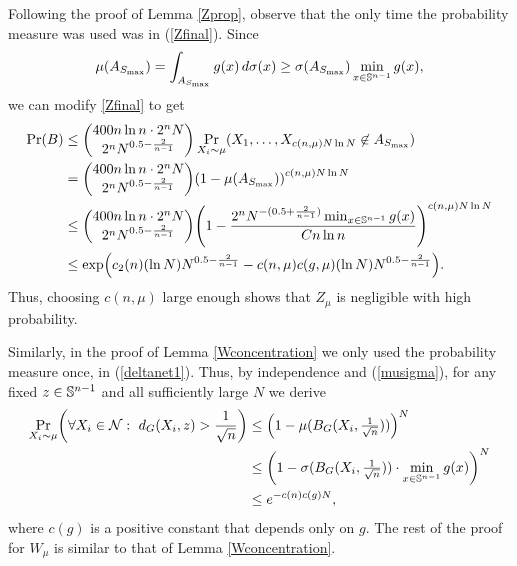 Following the proof of Lemma \ref{Zprop},  observe that the only time  the probability measure was used was in  (\ref{Zfinal}). Since
\begin{equation}\label{musigma}
\mu(A_{S_{\max}})=\int_{A_{S_{\max}}} g(x)\,d\sigma(x) \geq \sigma(A_{S_{\max}})\min_{x\in\mathbb{S}^{n-1}}g(x),
\end{equation}
we can modify \eqref{Zfinal} to get
\begin{align*}\Pr(B)&\leq\binom{400n\ln n\cdot2^{n}N}{2^{n}N^{0.5-\frac{2}{n-1}}}\Pr_{X_{i}\sim\mu}(X_{1},\ldots,X_{c(n,\mu)N\ln N}\not\in A_{S_{\max}})  \\&=\binom{400n\ln n\cdot2^{n}N}{2^{n}N^{0.5-\frac{2}{n-1}}}\left(1-\mu(A_{S_{\max}})\right)^{c(n,\mu)N\ln N}\\
& \leq\binom{400n\ln n\cdot2^{n}N}{2^{n}N^{0.5-\frac{2}{n-1}}}\left(1-\frac{2^{n}N^{-(0.5+\frac{2}{n-1})}\min_{x\in\Sp}g(x)}{Cn\ln n}\right)^{c(n,\mu)N\ln N}\\
& \leq\exp\left(c_2(n)(\ln N)N^{0.5-\frac{2}{n-1}}-c(n,\mu)c(g,\mu)(\ln N)N^{0.5-\frac{2}{n-1}}\right).
\end{align*}
Thus, choosing $c(n,\mu)$ large enough shows that $Z_\mu$ is negligible with high probability.

Similarly, in the proof of Lemma \ref{Wconcentration} we only used the probability measure once, in (\ref{deltanet1}). Thus, by independence and (\ref{musigma}), for any fixed $z\in\mathbb{S}^{n-1}$ and all sufficiently large $N$ we derive
\begin{align*}
\Pr_{X_i\sim\mu}\left(\forall X_i\in\mathcal{N} :\ d_{G}(X_{i},z)>\frac{1}{\sqrt{n}}\right) &\leq \left(1-\mu(B_G(X_i,\tfrac{1}{\sqrt{n}}))\right)^{N} \\
&\leq \left(1-\sigma(B_G(X_i,\tfrac{1}{\sqrt{n}}))\cdot\min_{x\in\Sp}g(x)\right)^N\\
&\leq e^{-c(n)c(g)N},
\end{align*}where $c(g)$ is a positive constant that depends only on $g$. The rest of the proof for $W_\mu$ is similar to that of Lemma \ref{Wconcentration}.




